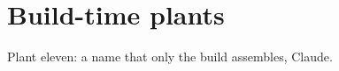 \section{Build-time plants}
\def\plantA{Cla}\def\plantB{ude}
Plant eleven: a name that only the build assembles, \plantA\plantB.
